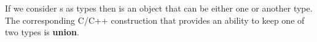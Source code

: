 \begin{example}[Sum][$\cat{C++}$]
  \label{ex:cpp_sum}
  If we consider s as types then
   is an object that can be either one or another
  type. The corresponding C/C++ construction that provides an ability
  to keep one of two types is \textbf{union}. 

    
          


\end{example}
